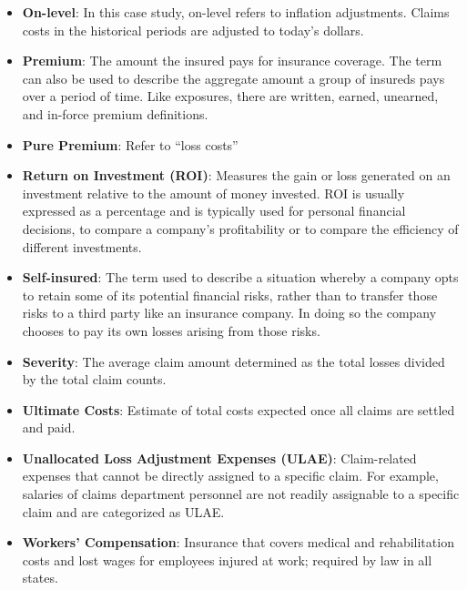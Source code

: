 \documentclass[12pt]{article}
\begin{document}
\begin{itemize}
\item \textbf{On-level}: In this case study, on-level refers to inflation adjustments.  Claims costs in the historical periods are adjusted to today’s dollars.
\item \textbf{Premium}: The amount the insured pays for insurance coverage. The term can also be used to describe the aggregate amount a group of insureds pays over a period of time. Like exposures, there are written, earned, unearned, and in-force premium definitions.
\item \textbf{Pure Premium}: Refer to ``loss costs''
\item \textbf{Return on Investment (ROI)}: Measures the gain or loss generated on an investment relative to the amount of money invested. ROI is usually expressed as a percentage and is typically used for personal financial decisions, to compare a company's profitability or to compare the efficiency of different investments. 
\item \textbf{Self-insured}: The term used to describe a situation whereby a company opts to retain some of its potential financial risks, rather than to transfer those risks to a third party like an insurance company. In doing so the company chooses to pay its own losses arising from those risks.
\item \textbf{Severity}: The average claim amount determined as the total losses divided by the total claim counts.
\item \textbf{Ultimate Costs}: Estimate of total costs expected once all claims are settled and paid.
\item \textbf{Unallocated Loss Adjustment Expenses (ULAE)}: Claim-related expenses that cannot be directly assigned to a specific claim. For example, salaries of claims department personnel are not readily assignable to a specific claim and are categorized as ULAE. 
\item \textbf{Workers' Compensation}: Insurance that covers medical and rehabilitation costs and lost wages for employees injured at work; required by law in all states.
\end{itemize}
\end{document}
